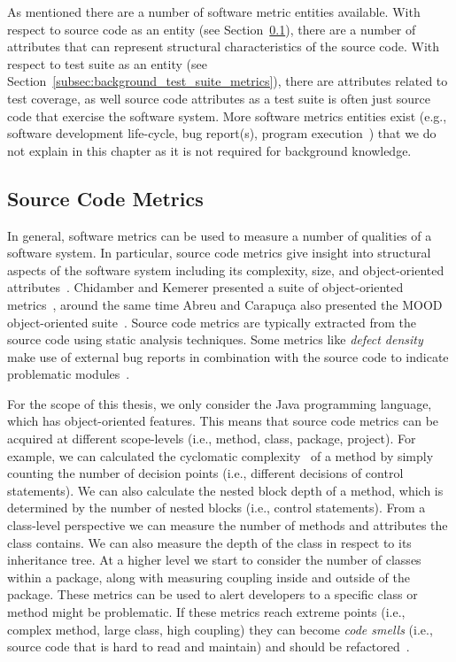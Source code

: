 As mentioned there are a number of software metric entities available. With respect to source code as an entity (see Section~\ref{subsec:background_source_code_metrics}), there are a number of attributes that can represent structural characteristics of the source code. With respect to test suite as an entity (see Section~\ref{subsec:background_test_suite_metrics}), there are attributes related to test coverage, as well source code attributes as a test suite is often just source code that exercise the software system. More software metrics entities exist (e.g., software development life-cycle, bug report(s), program execution~\cite{SS08}) that we do not explain in this chapter as it is not required for background knowledge.


\subsection{Source Code Metrics}
\label{subsec:background_source_code_metrics}
In general, software metrics can be used to measure a number of qualities of a software system. In particular, source code metrics give insight into structural aspects of the software system including its complexity, size, and object-oriented attributes~\cite{McCa76, Kan02, HWY09, Hend95, SRD12}. Chidamber and Kemerer presented a suite of object-oriented metrics~\cite{CK94}, around the same time Abreu and Carapu{\c{c}}a also presented the MOOD object-oriented suite~\cite{AC94}. Source code metrics are typically extracted from the source code using static analysis techniques. Some metrics like \emph{defect density} make use of external bug reports in combination with the source code to indicate problematic modules~\cite{FP98}. 

For the scope of this thesis, we only consider the Java programming language, which has object-oriented features. This means that source code metrics can be acquired at different scope-levels (i.e., method, class, package, project). For example, we can calculated the cyclomatic complexity~\cite{McCa76} of a method by simply counting the number of decision points (i.e., different decisions of control statements). We can also calculate the nested block depth of a method, which is determined by the number of nested blocks (i.e., control statements). From a class-level perspective we can measure the number of methods and attributes the class contains. We can also measure the depth of the class in respect to its inheritance tree. At a higher level we start to consider the number of classes within a package, along with measuring coupling inside and outside of the package. These metrics can be used to alert developers to a specific class or method might be problematic. If these metrics reach extreme points (i.e., complex method, large class, high coupling) they can become \emph{code smells} (i.e., source code that is hard to read and maintain) and should be refactored~\cite{FB99}.


